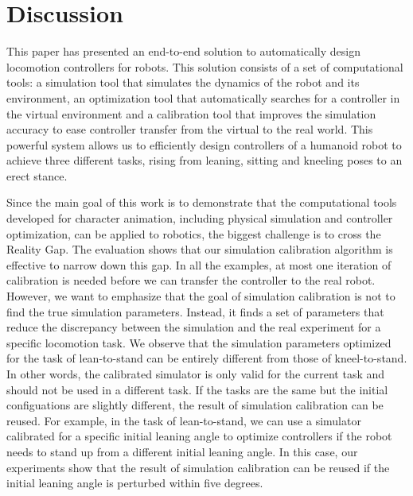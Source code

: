\section{Discussion}

This paper has presented an end-to-end solution to automatically design locomotion controllers for robots. This solution consists of a set of computational tools: a simulation tool that simulates the dynamics of the robot and its environment, an optimization tool that automatically searches for a controller in the virtual environment and a calibration tool that improves the simulation accuracy to ease controller transfer from the virtual to the real world. This powerful system allows us to efficiently design controllers of a humanoid robot to achieve three different tasks, rising from leaning, sitting and kneeling poses to an erect stance.

Since the main goal of this work is to demonstrate that the computational tools developed for character animation, including physical simulation and controller optimization, can be applied to robotics, the biggest challenge is to cross the Reality Gap. The evaluation shows that our simulation calibration algorithm is effective to narrow down this gap. In all the examples, at most one iteration of calibration is needed before we can transfer the controller to the real robot. However, we want to emphasize that the goal of simulation calibration is not to find the  true simulation parameters. Instead, it finds a set of parameters that reduce the discrepancy between the simulation and the real experiment for a specific locomotion task. We observe that the simulation parameters optimized for the task of lean-to-stand can be entirely different from those of kneel-to-stand. In other words, the calibrated simulator is only valid for the current task and should not be used in a different task. If the tasks are the same but the initial configuations are slightly different, the result of simulation calibration can be reused. For example, in the task of lean-to-stand, we can use a simulator calibrated for a specific initial leaning angle to optimize controllers if the robot needs to stand up from a different initial leaning angle. In this case, our experiments show that the result of simulation calibration can be reused if the initial leaning angle is perturbed within five degrees. 

